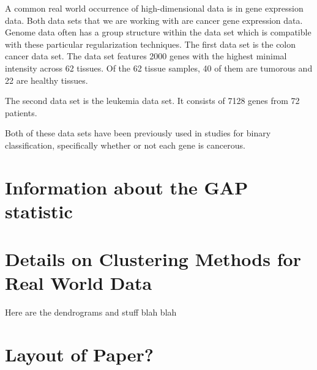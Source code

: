 \documentclass[11pt]{article}
\begin{document}
A common real world occurrence of high-dimensional data is in gene expression data. Both data sets that we are working with are cancer gene expression data. Genome data often has a group structure within the data set which is compatible with these particular regularization techniques. 
The first data set is the colon cancer data set. The data set features 2000 genes with the highest minimal intensity across 62 tissues. Of the 62 tissue samples, 40 of them are tumorous and 22 are healthy tissues. 

The second data set is the leukemia data set. It consists of 7128 genes from 72 patients. 

Both of these data sets have been previously used in studies for binary classification, specifically whether or not each gene is cancerous.



\newpage





\renewcommand\thesection{\Alph{section}}
\setcounter{section}{0}

\section{Information about the GAP statistic} \label{AppA}



\section{Details on Clustering Methods for Real World Data}

Here are the dendrograms and stuff blah blah



\newpage

\section{Layout of Paper?}
\end{document}
